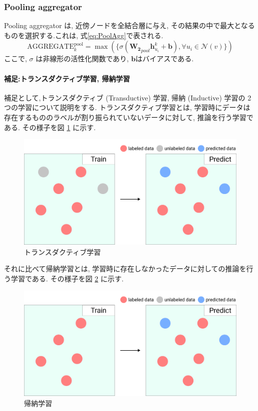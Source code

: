 \documentclass[a4j,twoside,12pt,dvipdfmx]{thesis} %
\begin{document}
\subsubsection{Pooling aggregator}
Pooling aggregator は, 近傍ノードを全結合層に与え, その結果の中で最大となるものを選択する.これは, 式\ref{eq:PoolAgg}で表される.
\begin{equation}
  \label{eq:PoolAgg}
  \mathrm{AGGREGATE}_{k}^{\mathrm{pool}} = \max(\{ \sigma ( \mathbf{W_{2}}_{pool} \mathbf{h}_{u_{i}}^{k} + \mathbf{b} ), \forall u_{i} \in \mathcal{N}(v) \})
\end{equation}
ここで, $\sigma$ は非線形の活性化関数であり, $\mathbf{b}$はバイアスである.

\paragraph*{補足:トランスダクティブ学習, 帰納学習}\label{omake}
補足として,トランスダクティブ (Transductive) 学習, 帰納 (Inductive) 学習の 2 つの学習について説明をする.
トランスダクティブ学習とは, 学習時にデータは存在するもののラベルが割り振られていないデータに対して, 推論を行う学習である. その様子を図 \ref{fig:Transductive} に示す.

\begin{figure}
  \centering
  \includegraphics[width=\linewidth]
  {img/Transductive.jpg}
  \caption{トランスダクティブ学習}
  \label{fig:Transductive}
\end{figure}

それに比べて帰納学習とは, 学習時に存在しなかったデータに対しての推論を行う学習である. その様子を図 \ref{fig:Inductive} に示す.


\begin{figure}
  \centering
  \includegraphics[width=\linewidth]
  {img/Inductive.jpg}
  \caption{帰納学習}
  \label{fig:Inductive}
\end{figure}
\end{document}
